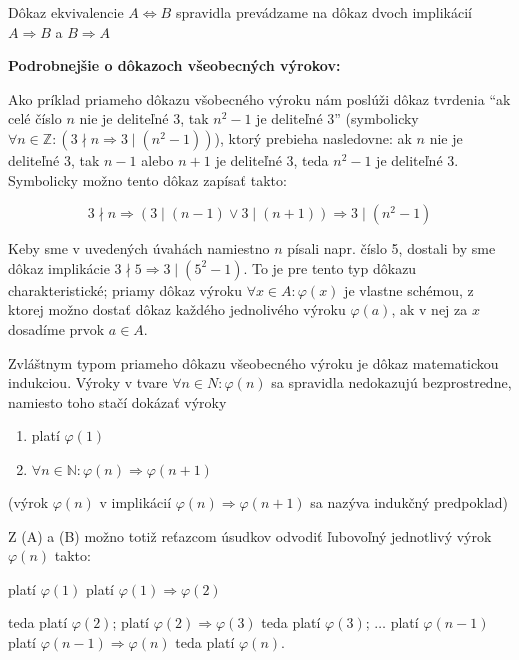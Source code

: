 Dôkaz ekvivalencie $A \iff B$ spravidla prevádzame na dôkaz dvoch implikácií
$A \Rightarrow B$ a $B \Rightarrow A$

\textbf{Podrobnejšie o dôkazoch všeobecných výrokov:}

Ako príklad priameho dôkazu všobecného výroku nám poslúži dôkaz tvrdenia
\enquote{ak celé číslo $n$ nie je deliteľné 3, tak $n^2 - 1$ je deliteľné 3}
(symbolicky $\forall n \in \mathbb{Z}: (3 \nmid n \Rightarrow 3 \mid
(n^2 - 1))$), ktorý prebieha nasledovne: ak $n$ nie je deliteľné 3, tak
$n - 1$ alebo $n + 1$ je deliteľné 3, teda $n^2 - 1$ je deliteľné 3. Symbolicky
možno tento dôkaz zapísať takto:

$$
3 \nmid n
\Rightarrow (3 \mid (n - 1) \lor 3 \mid (n + 1))
\Rightarrow 3 \mid (n^2 - 1)
$$

Keby sme v uvedených úvahách namiestno $n$ písali napr. číslo 5, dostali by sme
dôkaz implikácie $3 \nmid 5 \Rightarrow 3 \mid (5^2 - 1)$. To je pre tento typ
dôkazu charakteristické; priamy dôkaz výroku $\forall x \in A: \varphi (x)$ je
vlastne schémou, z ktorej možno dostať dôkaz každého jednolivého výroku
$\varphi (a)$, ak v nej za $x$ dosadíme prvok $a \in A$.

Zvláštnym typom priameho dôkazu všeobecného výroku je dôkaz matematickou
indukciou. Výroky v tvare $\forall n \in N: \varphi (n)$ sa spravidla
nedokazujú bezprostredne, namiesto toho stačí dokázať výroky

\begin{center}
  \begin{enumerate}[label=(\Alph*)]
    \item platí $\varphi (1)$
    \item $\forall n \in \mathbb{N}: \varphi (n) \Rightarrow \varphi (n + 1)$
  \end{enumerate}
\end{center}

(výrok $\varphi (n)$ v implikácií $\varphi (n) \Rightarrow \varphi (n + 1)$ sa
nazýva indukčný predpoklad)

Z (A) a (B) možno totiž reťazcom úsudkov odvodiť ľubovoľný jednotlivý výrok
$\varphi (n)$ takto:

platí $\varphi (1)$
platí $\varphi (1) \Rightarrow \varphi (2)$


teda platí $\varphi (2)$;
platí $\varphi(2) \Rightarrow \varphi(3)$
teda platí $\varphi(3)$;
$\ldots$
platí $\varphi (n - 1)$
platí $\varphi (n - 1) \Rightarrow \varphi (n)$
teda platí $\varphi (n)$.

